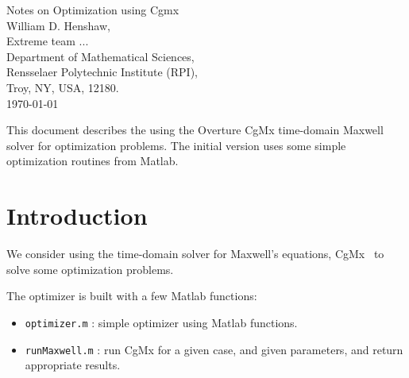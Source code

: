 \documentclass[11pt]{article}
\begin{document}
\vspace{5\baselineskip}
\begin{flushleft}
{\LARGE
Notes on Optimization using Cgmx \\
}
\vspace{2\baselineskip}
William D. Henshaw, \\
\large Extreme team ...\\
% 
\vspace{1\baselineskip}
% 
Department of Mathematical Sciences, \\
Rensselaer Polytechnic Institute (RPI), \\
Troy, NY, USA, 12180. \\
\vspace{\baselineskip}
\today\\

\vspace{4\baselineskip}



This document describes the using the Overture CgMx time-domain Maxwell solver for optimization problems.
The initial version uses some simple optimization routines from Matlab. 
% 

\end{flushleft}

\tableofcontents

\clearpage
\section{Introduction}

We consider using the time-domain solver for Maxwell's equations, CgMx~\cite{CgmxUserGuide} to solve some optimization problems.


The optimizer is built with a few Matlab functions: 
\begin{itemize}
  \item {\tt optimizer.m} : simple optimizer using Matlab functions.
  \item {\tt runMaxwell.m} : run CgMx for a given case, and given parameters, and return appropriate results.
\end{itemize}



\clearpage
\end{document}
